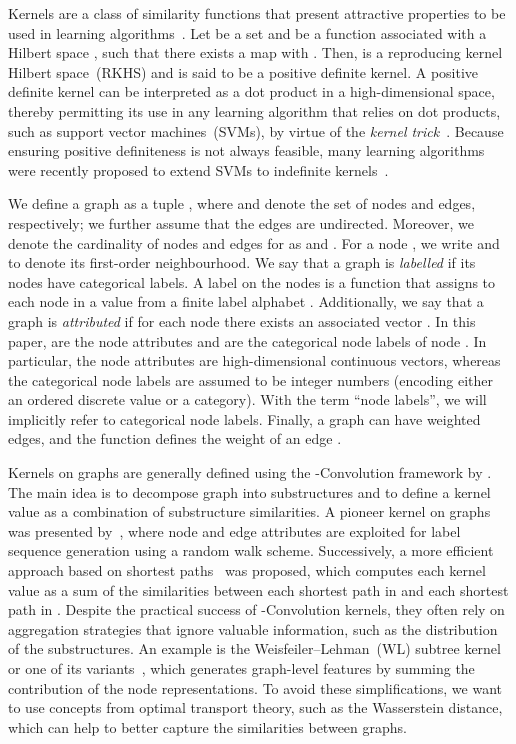 \documentclass{article}
\begin{document}
Kernels are a class of similarity functions that present attractive properties to be used in learning algorithms~\citep{scholkopf2002learning}.
Let  be a set and  be a function associated with a Hilbert space , such that there exists a map  with . Then,  is a reproducing kernel Hilbert space~(RKHS) and  is said to be a positive definite kernel. 
A positive definite kernel can be interpreted as a dot product in a high-dimensional space,
thereby permitting its use in any learning algorithm that relies on dot products, such as support vector machines~(SVMs), by virtue of the \emph{kernel trick}~\citep{scholkopf2001kernel}. Because ensuring positive definiteness is not always feasible, many learning algorithms were recently proposed to extend SVMs to indefinite kernels~\citep{ong2004learning, balcan2008theory, loosli2015learning, oglic2018learning}.

We define a graph as a tuple , where  and  denote the set of nodes and edges, respectively; we further assume that the edges are undirected. Moreover, we denote the cardinality of nodes and edges for  as   and . 
For a node , we write  and  to denote its first-order neighbourhood. We say that a graph is \emph{labelled} if its nodes have categorical labels. A label on the nodes is a function  that assigns to each node  in  a value  from a finite label alphabet . 
Additionally, we say that a graph is \emph{attributed} if for each node  there exists an associated vector . In this paper,  are the node attributes and  are the categorical node labels of node . In particular, the node attributes are high-dimensional continuous vectors, whereas the categorical node labels are assumed to be integer numbers (encoding either an ordered discrete value or a category). With the term ``node labels'', we will implicitly refer to categorical node labels.
Finally, a graph can have weighted edges, and the function  defines the weight  of an edge . 

Kernels on graphs are generally defined using the \mbox{-Convolution} framework by \cite{haussler1999convolution}. The main idea is to decompose graph  into substructures and to define a kernel value  as a combination of substructure similarities. A pioneer kernel on graphs was presented by~\citep{kashima2003}, where node and edge attributes are exploited for label sequence generation using a random walk scheme. Successively, a more efficient approach based on shortest paths~\citep{borgwardt2005shortest} was proposed, which computes each kernel value  as a sum of the similarities between each shortest path in  and each shortest path in . Despite the practical success of \mbox{-Convolution} kernels, they often rely on aggregation strategies that ignore valuable information, such as the distribution of the substructures. An example is the Weisfeiler--Lehman~(WL) subtree kernel or one of its variants~\citep{shervashidze2009FastSK, shervashidze2011weisfeiler, Rieck19b}, which generates graph-level features by summing the contribution of the node representations. To avoid these simplifications, we want to use concepts from optimal transport theory, such as the Wasserstein distance, which can help to better capture the similarities between graphs.  
\end{document}
